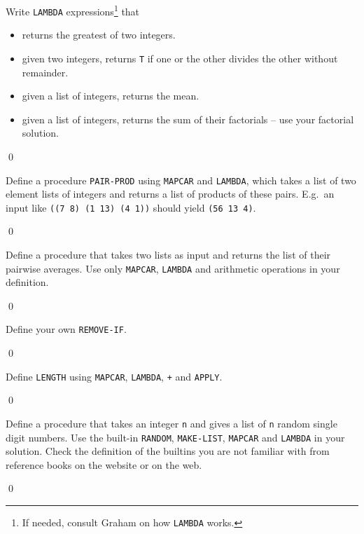 \documentclass[a4paper,11pt]{article}
\begin{document}
\noindent \hrulefill

\begin{uexercise}
Write \Verb+LAMBDA+ expressions\footnote{If needed, consult Graham on how \Verb+LAMBDA+ works.} that

\begin{itemize}
\item returns the greatest of two integers.
\item given two integers,  returns \Verb+T+ if one or the other divides the other without remainder.
\item given a list of integers, returns the mean.
\item given a list of integers, returns the sum of their factorials -- use your factorial solution.
\end{itemize}

\qed
\end{uexercise}

\begin{uexercise}
 Define a procedure \Verb+PAIR-PROD+ using \Verb+MAPCAR+ and \Verb+LAMBDA+, which takes a list of two element lists of integers and returns a list of products of these pairs. E.g.\  an input like \Verb+((7 8) (1 13) (4 1))+ should yield \Verb+(56 13 4)+.

\qed
\end{uexercise}

\begin{uexercise}
Define a procedure that takes two lists as input and returns the list of their pairwise averages. Use only \Verb+MAPCAR+, \Verb+LAMBDA+ and arithmetic operations in your definition.

\qed
\end{uexercise}

\begin{uexercise}
Define your own \Verb+REMOVE-IF+.

\qed
\end{uexercise}

\begin{uexercise}
Define \Verb+LENGTH+ using \Verb+MAPCAR+, \Verb+LAMBDA+, \Verb=+= and \Verb+APPLY+.

\qed
\end{uexercise}

\begin{uexercise}
\label{random-n} Define a procedure that takes an integer \Verb+n+ and gives a list of \Verb+n+ random single digit numbers. Use the built-in \Verb+RANDOM+, \Verb+MAKE-LIST+, \Verb+MAPCAR+ and \Verb+LAMBDA+ in your solution. Check the definition of the builtins you are not familiar with from reference books on the website or on the web.

\qed
\end{uexercise}
\end{document}

